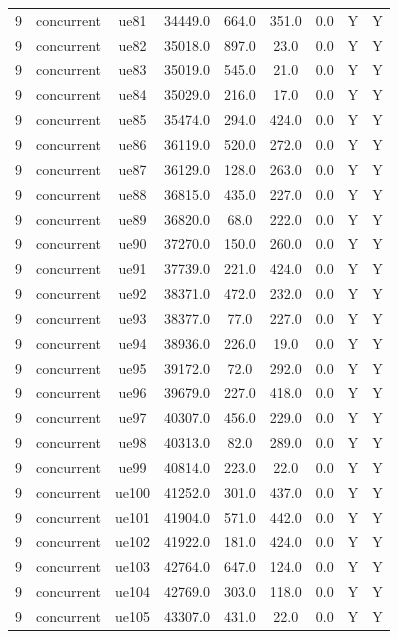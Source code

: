 \begin{table}[ht]
\begin{tabular}{|c|c|c|c|c|c|c|c|c|}
9 & concurrent & ue81 & 34449.0 & 664.0 & 351.0 & 0.0 & Y & Y \\
9 & concurrent & ue82 & 35018.0 & 897.0 & 23.0 & 0.0 & Y & Y \\
9 & concurrent & ue83 & 35019.0 & 545.0 & 21.0 & 0.0 & Y & Y \\
9 & concurrent & ue84 & 35029.0 & 216.0 & 17.0 & 0.0 & Y & Y \\
9 & concurrent & ue85 & 35474.0 & 294.0 & 424.0 & 0.0 & Y & Y \\
9 & concurrent & ue86 & 36119.0 & 520.0 & 272.0 & 0.0 & Y & Y \\
9 & concurrent & ue87 & 36129.0 & 128.0 & 263.0 & 0.0 & Y & Y \\
9 & concurrent & ue88 & 36815.0 & 435.0 & 227.0 & 0.0 & Y & Y \\
9 & concurrent & ue89 & 36820.0 & 68.0 & 222.0 & 0.0 & Y & Y \\
9 & concurrent & ue90 & 37270.0 & 150.0 & 260.0 & 0.0 & Y & Y \\
9 & concurrent & ue91 & 37739.0 & 221.0 & 424.0 & 0.0 & Y & Y \\
9 & concurrent & ue92 & 38371.0 & 472.0 & 232.0 & 0.0 & Y & Y \\
9 & concurrent & ue93 & 38377.0 & 77.0 & 227.0 & 0.0 & Y & Y \\
9 & concurrent & ue94 & 38936.0 & 226.0 & 19.0 & 0.0 & Y & Y \\
9 & concurrent & ue95 & 39172.0 & 72.0 & 292.0 & 0.0 & Y & Y \\
9 & concurrent & ue96 & 39679.0 & 227.0 & 418.0 & 0.0 & Y & Y \\
9 & concurrent & ue97 & 40307.0 & 456.0 & 229.0 & 0.0 & Y & Y \\
9 & concurrent & ue98 & 40313.0 & 82.0 & 289.0 & 0.0 & Y & Y \\
9 & concurrent & ue99 & 40814.0 & 223.0 & 22.0 & 0.0 & Y & Y \\
9 & concurrent & ue100 & 41252.0 & 301.0 & 437.0 & 0.0 & Y & Y \\
9 & concurrent & ue101 & 41904.0 & 571.0 & 442.0 & 0.0 & Y & Y \\
9 & concurrent & ue102 & 41922.0 & 181.0 & 424.0 & 0.0 & Y & Y \\
9 & concurrent & ue103 & 42764.0 & 647.0 & 124.0 & 0.0 & Y & Y \\
9 & concurrent & ue104 & 42769.0 & 303.0 & 118.0 & 0.0 & Y & Y \\
9 & concurrent & ue105 & 43307.0 & 431.0 & 22.0 & 0.0 & Y & Y \\

\end{tabular}
\end{table}
